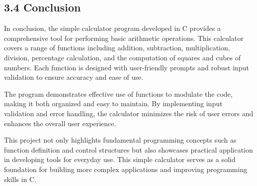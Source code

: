 \documentclass[a4paper,12pt]{article}
\begin{document}
\subsection*{3.4 Conclusion}
In conclusion, the simple calculator program developed in C provides a comprehensive tool for performing basic arithmetic operations. This calculator covers a range of functions including addition, subtraction, multiplication, division, percentage calculation, and the computation of squares and cubes of numbers. Each function is designed with user-friendly prompts and robust input validation to ensure accuracy and ease of use.

The program demonstrates effective use of functions to modulate the code, making it both organized and easy to maintain. By implementing input validation and error handling, the calculator minimizes the risk of user errors and enhances the overall user experience.

This project not only highlights fundamental programming concepts such as function definition and control structures but also showcases practical application in developing tools for everyday use. This simple calculator serves as a solid foundation for building more complex applications and improving programming skills in C.

\newpage
\end{document}
